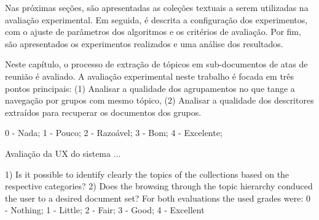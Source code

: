 



Nas próximas seções, são apresentadas as coleções textuais a serem utilizadas na avaliação experimental. Em seguida, é descrita a configuração dos experimentos, com o ajuste de parâmetros dos algoritmos e os critérios de avaliação. Por fim, são apresentados os experimentos realizados e uma análise dos resultados.





Neste capítulo, o processo de extração de tópicos em sub-documentos de atas de reunião é avaliado. A avaliação experimental neste trabalho é focada em três pontos principais: 
(1) Analisar a qualidade dos agrupamentos no que tange a navegação por grupos com mesmo tópico, 
(2) Analisar a qualidade dos descritores extraídos para recuperar os documentos dos grupos.











0 - Nada;
1 - Pouco;
2 - Razoável;
3 - Bom;
4 - Excelente;



Avaliação da UX do sistema ...























1) Is it possible to identify clearly the topics of the collections
based on the respective categories?
2) Does the browsing through the topic hierarchy conduced
the user to a desired document set?
For both evaluations the used grades were:
0 - Nothing;
1 - Little;
2 - Fair;
3 - Good;
4 - Excellent


